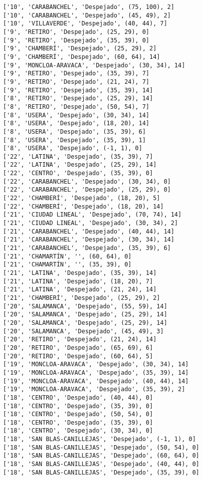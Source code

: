 \documentclass[11pt]{article}
\begin{document}
\begin{Verbatim}[commandchars=\\\{\}]
['10', 'CARABANCHEL', 'Despejado', (75, 100), 2]
['10', 'CARABANCHEL', 'Despejado', (45, 49), 2]
['10', 'VILLAVERDE', 'Despejado', (40, 44), 7]
['9', 'RETIRO', 'Despejado', (25, 29), 0]
['9', 'RETIRO', 'Despejado', (35, 39), 0]
['9', 'CHAMBERÍ', 'Despejado', (25, 29), 2]
['9', 'CHAMBERÍ', 'Despejado', (60, 64), 14]
['9', 'MONCLOA-ARAVACA', 'Despejado', (30, 34), 14]
['9', 'RETIRO', 'Despejado', (35, 39), 7]
['9', 'RETIRO', 'Despejado', (21, 24), 7]
['9', 'RETIRO', 'Despejado', (35, 39), 14]
['8', 'RETIRO', 'Despejado', (25, 29), 14]
['8', 'RETIRO', 'Despejado', (50, 54), 7]
['8', 'USERA', 'Despejado', (30, 34), 14]
['8', 'USERA', 'Despejado', (18, 20), 14]
['8', 'USERA', 'Despejado', (35, 39), 6]
['8', 'USERA', 'Despejado', (35, 39), 1]
['8', 'USERA', 'Despejado', (-1, 1), 0]
['22', 'LATINA', 'Despejado', (35, 39), 7]
['22', 'LATINA', 'Despejado', (25, 29), 14]
['22', 'CENTRO', 'Despejado', (35, 39), 0]
['22', 'CARABANCHEL', 'Despejado', (30, 34), 0]
['22', 'CARABANCHEL', 'Despejado', (25, 29), 0]
['22', 'CHAMBERÍ', 'Despejado', (18, 20), 5]
['22', 'CHAMBERÍ', 'Despejado', (18, 20), 14]
['21', 'CIUDAD LINEAL', 'Despejado', (70, 74), 14]
['21', 'CIUDAD LINEAL', 'Despejado', (30, 34), 2]
['21', 'CARABANCHEL', 'Despejado', (40, 44), 14]
['21', 'CARABANCHEL', 'Despejado', (30, 34), 14]
['21', 'CARABANCHEL', 'Despejado', (35, 39), 6]
['21', 'CHAMARTÍN', '', (60, 64), 0]
['21', 'CHAMARTÍN', '', (35, 39), 0]
['21', 'LATINA', 'Despejado', (35, 39), 14]
['21', 'LATINA', 'Despejado', (18, 20), 7]
['21', 'LATINA', 'Despejado', (21, 24), 14]
['21', 'CHAMBERÍ', 'Despejado', (25, 29), 2]
['20', 'SALAMANCA', 'Despejado', (55, 59), 14]
['20', 'SALAMANCA', 'Despejado', (25, 29), 14]
['20', 'SALAMANCA', 'Despejado', (25, 29), 14]
['20', 'SALAMANCA', 'Despejado', (45, 49), 3]
['20', 'RETIRO', 'Despejado', (21, 24), 14]
['20', 'RETIRO', 'Despejado', (65, 69), 6]
['20', 'RETIRO', 'Despejado', (60, 64), 5]
['19', 'MONCLOA-ARAVACA', 'Despejado', (30, 34), 14]
['19', 'MONCLOA-ARAVACA', 'Despejado', (35, 39), 14]
['19', 'MONCLOA-ARAVACA', 'Despejado', (40, 44), 14]
['19', 'MONCLOA-ARAVACA', 'Despejado', (35, 39), 2]
['18', 'CENTRO', 'Despejado', (40, 44), 0]
['18', 'CENTRO', 'Despejado', (35, 39), 0]
['18', 'CENTRO', 'Despejado', (50, 54), 0]
['18', 'CENTRO', 'Despejado', (35, 39), 0]
['18', 'CENTRO', 'Despejado', (30, 34), 0]
['18', 'SAN BLAS-CANILLEJAS', 'Despejado', (-1, 1), 0]
['18', 'SAN BLAS-CANILLEJAS', 'Despejado', (50, 54), 0]
['18', 'SAN BLAS-CANILLEJAS', 'Despejado', (60, 64), 0]
['18', 'SAN BLAS-CANILLEJAS', 'Despejado', (40, 44), 0]
['18', 'SAN BLAS-CANILLEJAS', 'Despejado', (35, 39), 0]

\end{Verbatim}
\end{document}

